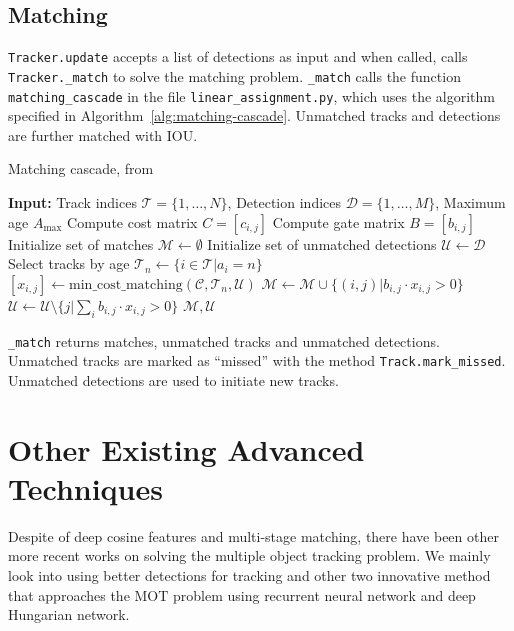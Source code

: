 \documentclass[conference]{IEEEtran}
\begin{document}
\subsection{Matching}

\texttt{Tracker.update} accepts a list of detections as input and when called, calls \texttt{Tracker.\_match} to solve the matching problem. \texttt{\_match} calls the function \texttt{matching\_cascade} in the file \texttt{linear\_assignment.py}, which uses the algorithm specified in Algorithm~\ref{alg:matching-cascade}. Unmatched tracks and detections are further matched with IOU.

\begin{algorithm}[t]
    \caption{Matching cascade, from \cite{Wojke2018deep}}
    \label{alg:matching-cascade}
    \begin{algorithmic}[1]
        \Statex \textbf{Input:} Track indices $\mathcal{T} = \{1, \dots, N\}$, Detection indices $\mathcal{D} = \{1, \dots, M\}$, Maximum age $A_\textrm{max}$
        \State Compute cost matrix $C = [c_{i,j}]$
        \State Compute gate matrix $B = [b_{i,j}]$
        \State Initialize set of matches $\mathcal{M} \gets \emptyset$
        \State Initialize set of unmatched detections $\mathcal{U} \gets \mathcal{D}$
            \State Select tracks by age $\mathcal{T}_n \gets \{i \in \mathcal{T} | a_i = n\}$
            \State $[x_{i,j}] \gets \mathrm{min\_cost\_matching}(\mathcal{C}, \mathcal{T}_n, \mathcal{U})$
            \State $\mathcal{M} \gets \mathcal{M} \cup \{(i, j) | b_{i,j} \cdot x_{i,j} > 0\}$
            \State $\mathcal{U} \gets \mathcal{U} \setminus \{j | \sum_i b_{i,j} \cdot x_{i,j} > 0\}$
        \EndFor
        \State \Return $\mathcal{M}, \mathcal{U}$
    \end{algorithmic}
\end{algorithm}

\texttt{\_match} returns matches, unmatched tracks and unmatched detections. Unmatched tracks are marked as ``missed'' with the method \texttt{Track.mark\_missed}. Unmatched detections are used to initiate new tracks.

\section{Other Existing Advanced Techniques}
Despite of deep cosine features and multi-stage matching, there have been other more recent works on solving the multiple object tracking problem.
We mainly look into using better detections for tracking and other two innovative method that approaches the MOT problem using recurrent neural network and deep Hungarian network.
\end{document}
